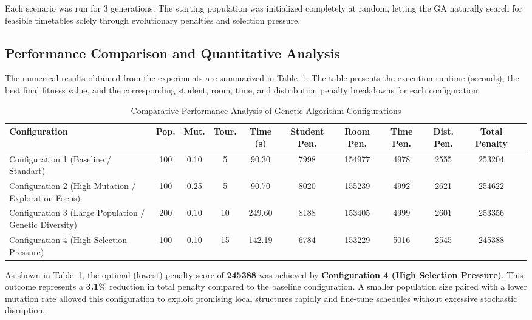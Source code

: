 Each scenario was run for $3$ generations. The starting population was initialized completely at random, letting the GA naturally search for feasible timetables solely through evolutionary penalties and selection pressure.

\subsection{Performance Comparison and Quantitative Analysis}
\label{subsec:performance_comparisons}

The numerical results obtained from the experiments are summarized in Table~\ref{tab:ga_experiments}. The table presents the execution runtime (seconds), the best final fitness value, and the corresponding student, room, time, and distribution penalty breakdowns for each configuration.

\begin{table}[htbp]
\centering
\caption{Comparative Performance Analysis of Genetic Algorithm Configurations}
\label{tab:ga_experiments}
\begin{tabular}{lcccccccccr}
\hline
\textbf{Configuration} & \textbf{Pop.} & \textbf{Mut.} & \textbf{Tour.} & \textbf{Time (s)} & \textbf{Student Pen.} & \textbf{Room Pen.} & \textbf{Time Pen.} & \textbf{Dist. Pen.} & \textbf{Total Penalty} \\ \hline
Configuration 1 (Baseline / Standart) & 100 & 0.10 & 5 & 90.30 & 7998 & 154977 & 4978 & 2555 & 253204 \\
Configuration 2 (High Mutation / Exploration Focus) & 100 & 0.25 & 5 & 90.70 & 8020 & 155239 & 4992 & 2621 & 254622 \\
Configuration 3 (Large Population / Genetic Diversity) & 200 & 0.10 & 10 & 249.60 & 8188 & 153405 & 4999 & 2601 & 253356 \\
Configuration 4 (High Selection Pressure) & 100 & 0.10 & 15 & 142.19 & 6784 & 153229 & 5016 & 2545 & 245388 \\ \hline
\end{tabular}
\end{table}

As shown in Table~\ref{tab:ga_experiments}, the optimal (lowest) penalty score of \textbf{245388} was achieved by \textbf{Configuration 4 (High Selection Pressure)}. This outcome represents a \textbf{3.1\%} reduction in total penalty compared to the baseline configuration. A smaller population size paired with a lower mutation rate allowed this configuration to exploit promising local structures rapidly and fine-tune schedules without excessive stochastic disruption.

